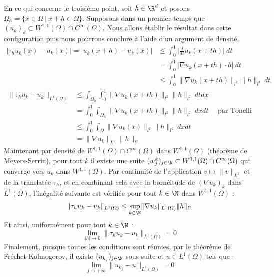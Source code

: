 En ce qui concerne le troisième point, soit $h\in \R^d$ et posons $\Omega_h = \big\{ x \in \Omega \ | \ x + h \in \Omega \big\}$.
Supposons dans un premier temps que $(u_k)_k \subset W^{1,1}(\Omega) \cap C^{\infty}(\Omega)$. Nous allons établir le résultat dans cette configuration puis nous pourrons conclure à l'aide d'un argument de densité.
\begin{equation*}
\begin{split}
    |\tau_h u_k(x) - u_k(x)| = |u_k(x+h) - u_k(x)| &\leq \int_{0}^{1} \Big| \frac{d}{dt}u_k(x+th) \Big| \ dt \\
    &= \int_{0}^{1} \big| \nabla u_k(x+th) \cdot h \big| \ dt \\
    &\leq \int_{0}^{1} \|\nabla u_k(x + th)\|_{l^2}\|h\|_{l^2} \ dt
\end{split}
\end{equation*}
\begin{equation*}
\begin{split}
    \| \tau_h u_k - u_k \|_{L^1(\Omega)} &\leq \int_{\Omega_h} \int_{0}^{1} \|\nabla u_k(x + th)\|_{l^2}\|h\|_{l^2}  \ dt dx \\
    &= \int_{0}^{1} \int_{\Omega_h} \|\nabla u_k(x + th)\|_{l^2}\|h\|_{l^2}  \ dx dt \quad \text{ par Tonelli} \\
    &\leq \int_{0}^{1} \int_{\Omega} \| \nabla u_k(x) \|_{l^2} \|h\|_{l^2} \ dx dt \\
    &= \| \nabla u_k \|_{L^1} \|h\|_{l^2}
\end{split}
\end{equation*}
Maintenant par densité de $W^{1,1}(\Omega) \cap C^{\infty}(\Omega)$ dans $W^{1,1}(\Omega)$ (théorème de Meyers-Serrin), pour tout $k$ il existe une suite $(w^k_j)_{j \in \N} \subset W^{1,1}(\Omega)\cap C^{\infty}(\Omega)$ qui converge vers $u_k$ dans $W^{1,1}(\Omega)$.
Par continuité de l'application $v \mapsto \| v \|_{L^1}$ et de la translatée $\tau_h$, et en combinant cela avec la bornéitude de $(\nabla u_k)_k$ dans $L^1(\Omega)$, l'inégalité suivante est vérifiée pour tout $k\in \N$ dans $W^{1,1}(\Omega)$ :
$$ \| \tau_h u_k - u_k \|_{L^1(\Omega)} \leq \underset{k \in \N}{\sup}\| \nabla u_k \|_{L^1(\Omega)} \|h\|_{l^2} $$
Et ainsi, uniformément pour tout $k \in \N$ :
$$\underset{|h| \to 0}{\lim} \| \tau_h u_k - u_k \|_{L^1(\Omega)} = 0 $$
Finalement, puisque toutes les conditions sont réunies, par le théorème de Fréchet-Kolmogorov, il existe $(u_{k_j})_{j \in \N}$ sous suite et $u \in L^1(\Omega)$ tels que :
$$ \underset{j \to +\infty}{\lim} \| u_{k_j} - u \|_{L^1(\Omega)} = 0 $$


